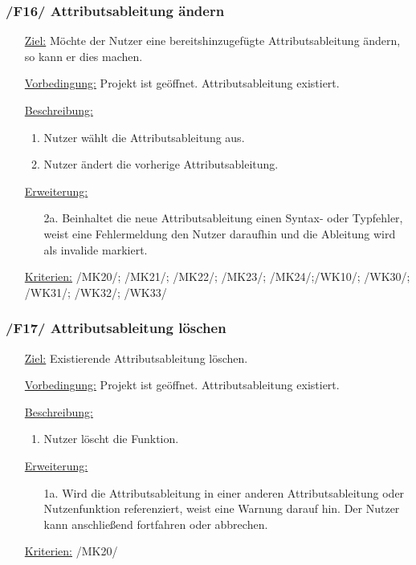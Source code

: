 \documentclass{article}
\begin{document}
\subsubsection*{\textbf{/F16/} Attributsableitung ändern} \label{sec:f:Attributsableitung ändern}
\begin{itemize}
    \item[\underline{Ziel:}] Möchte der Nutzer eine bereitshinzugefügte Attributsableitung ändern, so kann er dies machen.
    \item[\underline{Vorbedingung:}] Projekt ist geöffnet. Attributsableitung existiert.
    \item[\underline{Beschreibung:}]
    \begin{enumerate}
        \item Nutzer wählt die Attributsableitung aus.
        \item Nutzer ändert die vorherige Attributsableitung.
    \end{enumerate}
    \item[\underline{Erweiterung:}]
    \begin{itemize}
        \item[2a.] Beinhaltet die neue Attributsableitung einen Syntax- oder Typfehler, weist eine Fehlermeldung den Nutzer daraufhin und die Ableitung wird als invalide markiert. 
    \end{itemize}
    \item[\underline{Kriterien:}] /MK20/; /MK21/; /MK22/; /MK23/; /MK24/;\newline/WK10/; /WK30/; /WK31/; /WK32/; /WK33/
\end{itemize}

\subsubsection*{\textbf{/F17/} Attributsableitung löschen} \label{sec:f:Attributsableitung löschen}
\begin{itemize}
    \item[\underline{Ziel:}] Existierende Attributsableitung löschen.
    \item[\underline{Vorbedingung:}] Projekt ist geöffnet. Attributsableitung existiert.
    \item[\underline{Beschreibung:}]
    \begin{enumerate}
        \item Nutzer löscht die Funktion.
    \end{enumerate}
    \item[\underline{Erweiterung:}]
    \begin{itemize}
        \item[1a.] Wird die Attributsableitung in einer anderen Attributsableitung oder Nutzenfunktion referenziert, weist eine Warnung darauf hin. Der Nutzer kann anschließend fortfahren oder abbrechen.
    \end{itemize}
    \item[\underline{Kriterien:}] /MK20/
\end{itemize}
\end{document}

